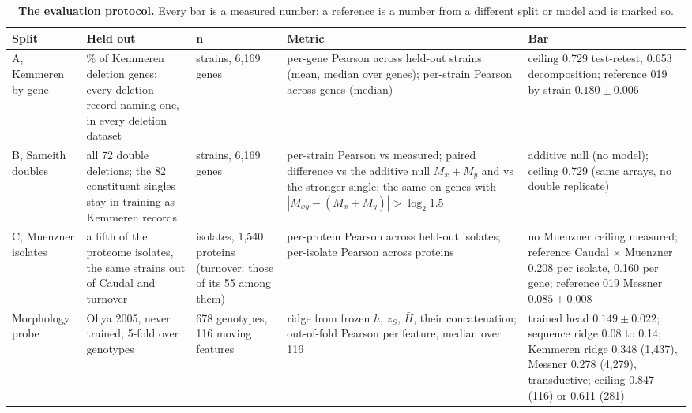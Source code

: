 \begin{table}[htbp]
\centering
\scriptsize
\setlength{\tabcolsep}{3pt}
\caption[]{\textbf{The evaluation protocol.} Every bar is a measured number; a reference is
a number from a different split or model and is marked so.}
\label{tab:output-protocol}
\begin{tabular}{>{\raggedright\arraybackslash}p{18mm}>{\raggedright\arraybackslash}p{44mm}>{\raggedright\arraybackslash}p{22mm}>{\raggedright\arraybackslash}p{44mm}>{\raggedright\arraybackslash}p{44mm}}
\toprule
Split & Held out & n & Metric & Bar \\
\midrule
A, Kemmeren by gene & 10\% of Kemmeren deletion genes; every deletion record naming one, in every deletion dataset & 148 strains, 6{,}169 genes & per-gene Pearson across held-out strains (mean, median over genes); per-strain Pearson across genes (median) & ceiling 0.729 test-retest, 0.653 decomposition; reference 019 by-strain $0.180 \pm 0.006$ \\
B, Sameith doubles & all 72 double deletions; the 82 constituent singles stay in training as Kemmeren records & 72 strains, 6{,}169 genes & per-strain Pearson vs measured; paired difference vs the additive null $M_x + M_y$ and vs the stronger single; the same on genes with $|M_{xy} - (M_x + M_y)| > \log_2 1.5$ & additive null (no model); ceiling 0.729 (same arrays, no double replicate) \\
C, Muenzner isolates & a fifth of the proteome isolates, the same strains out of Caudal and turnover & 159 isolates, 1{,}540 proteins (turnover: those of its 55 among them) & per-protein Pearson across held-out isolates; per-isolate Pearson across proteins & no Muenzner ceiling measured; reference Caudal $\times$ Muenzner 0.208 per isolate, 0.160 per gene; reference 019 Messner $0.085 \pm 0.008$ \\
Morphology probe & Ohya 2005, never trained; 5-fold over genotypes & 4{,}678 genotypes, 116 moving features & ridge from frozen $h$, $z_S$, $\bar H$, their concatenation; out-of-fold Pearson per feature, median over 116 & 019 trained head $0.149 \pm 0.022$; sequence ridge 0.08 to 0.14; Kemmeren ridge 0.348 (1{,}437), Messner 0.278 (4{,}279), transductive; ceiling 0.847 (116) or 0.611 (281) \\
\bottomrule
\end{tabular}
\end{table}


